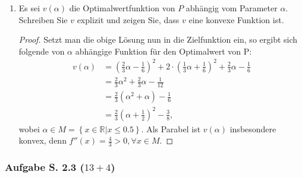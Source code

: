 \documentclass[12pt]{extreport} %
\theoremstyle{named}
\theoremstyle{nnamed}
\theoremstyle{itshape}
\theoremstyle{normal}
\begin{document}
\begin{enumerate}
\begin{proof}
\begin{description}
			Unter Verwendung von Teilaufgabe a) und Satz 2.6.12 ist somit für $\alpha \leq - \frac{1}{2}$ 
			$$ \begin{pmatrix} x_1 \\ x_2\end{pmatrix} = \begin{pmatrix} \frac{2}{3}\alpha- \frac{1}{6} \\ \frac{1}{3}\alpha +\frac{1}{6} \end{pmatrix} 
			\text{ und für $\alpha > -\frac{1}{2}$ ist }
			\begin{pmatrix} x_1 \\ x_2\end{pmatrix} = \begin{pmatrix} -0.5 \\ 0 \end{pmatrix} $$
			globaler Minimalpunkt.
			\end{description}
		\end{proof}
	\item Es sei $v(\alpha)$ die Optimalwertfunktion von $P$ abhängig vom Parameter $\alpha$. Schreiben Sie $v$ explizit und zeigen Sie, dass $v$ eine konvexe Funktion ist.
		\begin{proof}
			Setzt man die obige Lösung nun in die Zielfunktion ein, so ergibt sich folgende von $\alpha$ abhängige Funktion für den Optimalwert von P:
			\begin{align*}
				v(\alpha) & = \left(\frac{2}{3}\alpha- \frac{1}{6} \right)^2 + 2 \cdot \left(\frac{1}{3}\alpha +\frac{1}{6} \right)^2+ \frac{2}{3} \alpha - \frac{1}{6} \\
				& = \frac{2}{3}\alpha^2+\frac{2}{3}\alpha - \frac{1}{12} \\
				& = \frac{2}{3} \left(\alpha^2 + \alpha \right) -\frac{1}{6} \\
				& = \frac{2}{3} \left(\alpha +\frac{1}{2} \right)^2-\frac{3}{8}, %
			\end{align*}
			wobei $\alpha \in M = \left\{x \in \mathbb{R} | x \leq 0.5\right\}$. Als Parabel ist $v(\alpha)$ insbesondere konvex, denn $f''(x)=\frac{4}{3} > 0,  \forall x \in M$.
		\end{proof}
\end{enumerate}
 
\newpage

\subsubsection{Aufgabe S. 2.3 (\textit{$13 + 4$})}
\end{document}
